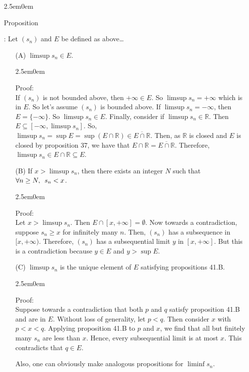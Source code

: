 \documentclass{book}
\newcommand{\hTwo}{%
   \color{MidnightBlue}%
   \fontsize{13}{15}\selectfont%
}
\newcommand{\hThree}{%
   \color{PineGreen}
   \fontsize{13}{15}\selectfont%
}
\newenvironment{myIndent}{%
   \begin{adjustwidth}{2.5em}{0em}%
}{%
   \end{adjustwidth}%
}
\newcommand{\retTwo}{\hfill\bigbreak}
\newcommand{\myHS}{ \hspace{0.5em}}
\newcounter{PropNumber}
\newcommand{\propCount}[1][1]{%
   \addtocounter{PropNumber}{#1}%
   \thePropNumber%
}
\begin{document}
   {\begin{myIndent} \hTwo
      Proposition \propCount: Let $(s_n)$ and $E$ be defined as above\dots
      \begin{itemize}
         \item[(A)] $\limsup{s_n} \in E$.
         
         {\begin{myIndent} \hThree
            Proof:\\
            If $(s_n)$ is not bounded above, then $+\infty \in E$. So $\limsup{s_n} = +\infty$ which is in $E$. So let's assume $(s_n)$ is bounded above. \retTwo
            If $\limsup{s_n} = -\infty$, then $E = \{-\infty\}$. So $\limsup{s_n} \in E$.\retTwo
            Finally, consider if $\limsup{s_n} \in \mathbb{R}$. Then $E \subseteq [-\infty, \limsup{s_n}]$. So,\\
            $\limsup{s_n} = \sup{E} = \sup{(E \cap \mathbb{R})} \in \overbar{E \cap \mathbb{R}}$. Then, as $\mathbb{R}$ is closed and $E$ is closed by proposition 37, we have that $E \cap \mathbb{R} = \overbar{E \cap \mathbb{R}}$. Therefore,\\ $\limsup{s_n} \in E \cap \mathbb{R} \subseteq E$. \retTwo
         \end{myIndent}}

         \item[(B)] If $x > \limsup{s_n}$, then there exists an integer $N$ such that $\forall n \geq N,\myHS s_n < x$. 
         
         {\begin{myIndent} \hThree
            Proof:\\
            Let $x > \limsup{s_n}$. Then $E \cap [x, +\infty] = \emptyset$. Now towards a contradiction, suppose $s_n \geq x$ for infinitely many $n$. Then, $(s_n)$ has a subsequence in $[x, +\infty)$. Therefore, $(s_n)$ has a subsequential limit $y$ in $[x, +\infty]$. But this is a contradiction because $y \in E$ and $y > \sup{E}$.
            \retTwo
         \end{myIndent}}

         \item[(C)] $\limsup{s_n}$ is the unique element of $E$ satisfying propositions 41.B.
         
         {\begin{myIndent} \hThree
            Proof:\\
            Suppose towards a contradiction that both $p$ and $q$ satisfy  proposition 41.B and are in $E$. Without loss of generality, let $p < q$. Then consider $x$ with $p < x < q$. Applying proposition 41.B to $p$ and $x$, we find that all but finitely many $s_n$ are less than $x$. Hence, every subsequential limit is at most $x$. This contradicts that $q \in E$.
            \retTwo
         \end{myIndent}}

         \item[] Also, one can obviously make analogous propositions for $\liminf{s_n}$.
      \end{itemize}
   \end{myIndent}}
\end{document}
